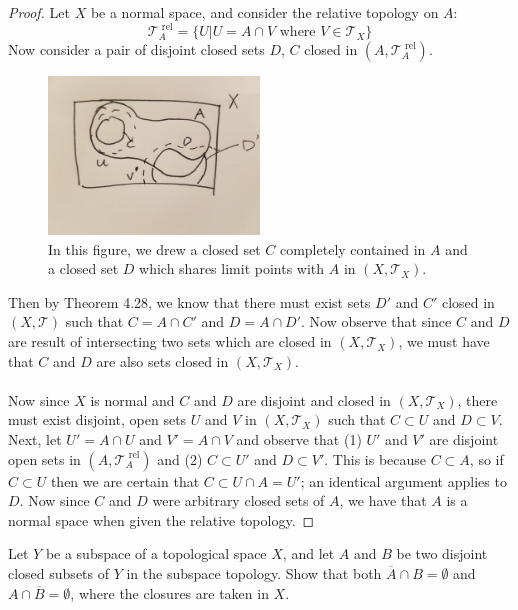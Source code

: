 \documentclass[a4paper,12pt,twoside]{hmcpset}
\begin{document}
\begin{proof}
    Let $X$ be a normal space, and consider the relative topology on
    $A$:
    $$
    \mathscr{T}_A^\text{ rel} = \{U | U = A \cap V \text{ where } V \in \mathscr{T}_X\}
    $$
    Now consider a pair of disjoint closed sets $D$, $C$ closed in
    $(A, \mathscr{T}_A^\text{ rel})$.
    \begin{figure}[h!]
        \centering
        \includegraphics[width = 0.5\textwidth]{figures_theorems_sect_5/sketch_thm_5_23.jpg}
        \caption{In this figure, we drew a closed set $C$ completely
        contained in $A$ and a closed set $D$ which shares limit
        points with $A$ in $(X, \mathscr{T}_X)$.}
    \end{figure}
    Then by Theorem 4.28, we know that there must exist sets $D'$ and
    $C'$ closed in $(X, \mathscr{T})$ such that $C = A \cap C'$ and $D
    = A \cap D'$. Now observe that since $C$ and $D$ are result of
    intersecting two sets which are closed in $(X, \mathscr{T}_X)$, we
    must have that $C$ and $D$ are also sets closed in $(X,
    \mathscr{T}_X)$. \\
    \\
    Now since $X$ is normal and $C$ and $D$ are disjoint and closed in
    $(X, \mathscr{T}_X)$, there must exist
    disjoint, open sets $U$ and $V$ in $(X, \mathscr{T}_X)$ such that $C
    \subset U$ and $D \subset V$. Next, let $U' = A \cap U$ and $V' =
    A \cap V$ and observe that (1) $U'$ and $V'$ are disjoint open
    sets in $(A, \mathscr{T}_A^\text{ rel})$ and (2) $C \subset U'$ and $D \subset
    V'$. This is because $C \subset A$, so if $C \subset U$ then we
    are certain that $C \subset U \cap A = U'$; an identical argument
    applies to $D$. Now since $C$ and $D$ were arbitrary
    closed sets of $A$, we have that $A$ is a normal space when given
    the relative topology. 
\end{proof}

\begin{exercise}[Exercise 5.25]
Let $Y$ be a subspace of a topological space
$X$, and let $A$ and $B$ be two disjoint closed subsets of $Y$ in the
subspace topology. Show that both $\overline{A} \cap B = \emptyset$
and $A \cap \overline{B} = \emptyset$, where the closures are taken in
$X$. 
\end{exercise}
\end{document}

